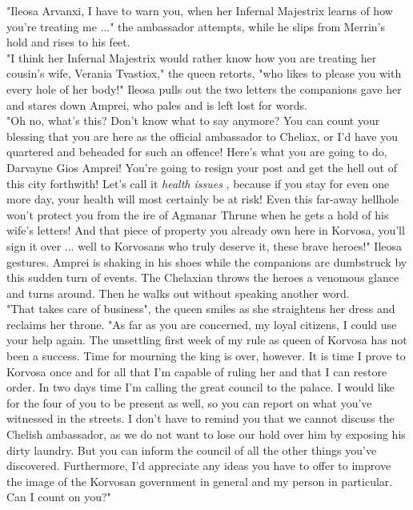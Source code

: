 "Ileosa Arvanxi, I have to warn you, when her Infernal Majestrix learns of how you're treating me ..." the ambassador attempts, while he slips from Merrin's hold and rises to his feet.\\

"I think her Infernal Majestrix would rather know how you are treating her cousin's wife, Verania Tvastiox," the queen retorts, "who likes to please you with every hole of her body!" Ileosa pulls out the two letters the companions gave her and stares down Amprei, who pales and is left lost for words.\\

"Oh no, what's this? Don't know what to say anymore? You can count your blessing that you are here as the official ambassador to Cheliax, or I'd have you quartered and beheaded for such an offence! Here's what you are going to do, Darvayne Gios Amprei! You're going to resign your post and get the hell out of this city forthwith! Let's call it {\itshape health issues} , because if you stay for even one more day, your health will most certainly be at risk! Even this far-away hellhole won't protect you from the ire of Agmanar Thrune when he gets a hold of his wife's letters! And that piece of property you already own here in Korvosa, you'll sign it over ... well to Korvosans who truly deserve it, these brave heroes!" Ileosa gestures. Amprei is shaking in his shoes while the companions are dumbstruck by this sudden turn of events. The Chelaxian throws the heroes a venomous glance and turns around. Then he walks out without speaking another word.\\

"That takes care of business", the queen smiles as she straightens her dress and reclaims her throne. "As far as you are concerned, my loyal citizens, I could use your help again. The unsettling first week of my rule as queen of Korvosa has not been a success. Time for mourning the king is over, however. It is time I prove to Korvosa once and for all that I'm capable of ruling her and that I can restore order. In two days time I'm calling the great council to the palace. I would like for the four of you to be present as well, so you can report on what you've witnessed in the streets. I don't have to remind you that we cannot discuss the Chelish ambassador, as we do not want to lose our hold over him by exposing his dirty laundry. But you can inform the council of all the other things you've discovered. Furthermore, I'd appreciate any ideas you have to offer to improve the image of the Korvosan government in general and my person in particular. Can I count on you?"\\

